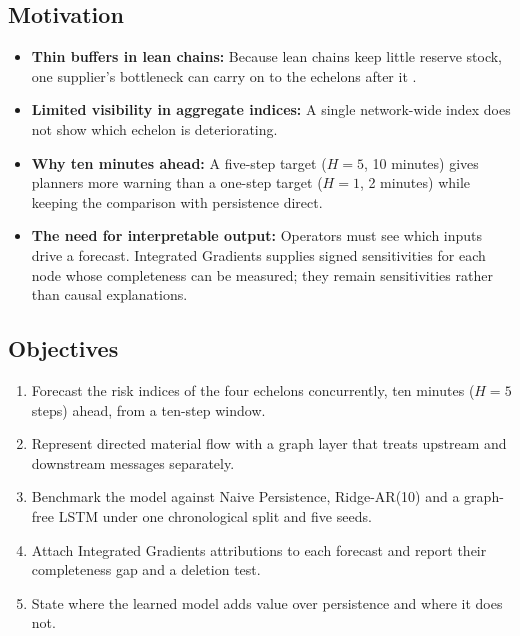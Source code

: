 \documentclass[conference]{IEEEtran}
\begin{document}
\subsection{Motivation}
\begin{itemize}
\item \textbf{Thin buffers in lean chains:} Because lean chains keep little reserve stock, one supplier's bottleneck can carry on to the echelons after it \cite{r1}.
\item \textbf{Limited visibility in aggregate indices:} A single network-wide index does not show which echelon is deteriorating.
\item \textbf{Why ten minutes ahead:} A five-step target ($H=5$, 10 minutes) gives planners more warning than a one-step target ($H=1$, 2 minutes) while keeping the comparison with persistence direct.
\item \textbf{The need for interpretable output:} Operators must see which inputs drive a forecast. Integrated Gradients supplies signed sensitivities for each node whose completeness can be measured; they remain sensitivities rather than causal explanations.
\end{itemize}

\subsection{Objectives}
\begin{enumerate}
\item[\textbf{O1.}] Forecast the risk indices of the four echelons concurrently, ten minutes ($H=5$ steps) ahead, from a ten-step window.
\item[\textbf{O2.}] Represent directed material flow with a graph layer that treats upstream and downstream messages separately.
\item[\textbf{O3.}] Benchmark the model against Naive Persistence, Ridge-AR(10) and a graph-free LSTM under one chronological split and five seeds.
\item[\textbf{O4.}] Attach Integrated Gradients attributions to each forecast and report their completeness gap and a deletion test.
\item[\textbf{O5.}] State where the learned model adds value over persistence and where it does not.
\end{enumerate}
\end{document}
